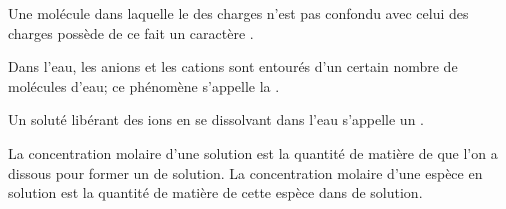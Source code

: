 Une molécule dans laquelle le \dotline{2cm} des charges \dotline{2cm} n'est pas
confondu avec celui des charges \dotline{2cm} possède de ce fait un caractère
\dotline{2cm}.

Dans l'eau, les anions et les cations sont entourés d'un certain nombre de
molécules d'eau; ce phénomène s'appelle la \dotline{2cm}.

Un soluté libérant des ions en se dissolvant dans l'eau s'appelle un
\dotline{2cm}.

La concentration molaire d'une solution est la quantité de matière de
\dotline{2cm} que l'on a dissous pour former un \dotline{2cm} de solution. La
concentration molaire d'une espèce en solution est la quantité de matière de
cette espèce \dotline{2cm} dans \dotline{2cm} de solution.


